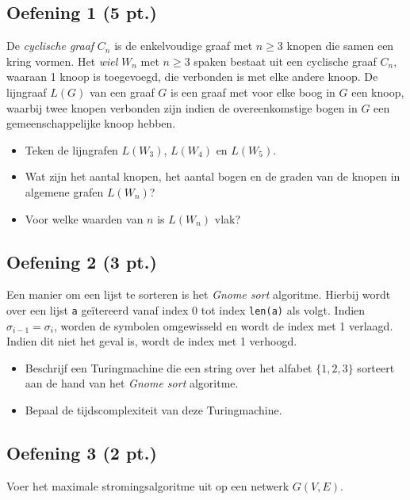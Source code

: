 \documentclass[kulak]{kulakarticle} %
\begin{document}
	\subsection*{Oefening 1 (5 pt.)}

	De \textit{cyclische graaf} \(C_n\) is de enkelvoudige graaf met \(n\geq3\) knopen die samen een kring vormen. Het \textit{wiel} \(W_n\) met \(n\geq3\) spaken bestaat uit een cyclische graaf \(C_n\), waaraan 1 knoop is toegevoegd, die verbonden is met elke andere knoop. De lijngraaf \(L(G)\) van een graaf \(G\) is een graaf met voor elke boog in \(G\) een knoop, waarbij twee knopen verbonden zijn indien de overeenkomstige bogen in \(G\) een gemeenschappelijke knoop hebben.

	\begin{itemize}
		\item Teken de lijngrafen \(L(W_3)\), \(L(W_4)\) en \(L(W_5)\).
		\item Wat zijn het aantal knopen, het aantal bogen en de graden van de knopen in algemene grafen \(L(W_n)\)?
		\item Voor welke waarden van \(n\) is \(L(W_n)\) vlak?
	\end{itemize}

	\subsection*{Oefening 2 (3 pt.)}

	Een manier om een lijst te sorteren is het \textit{Gnome sort} algoritme. Hierbij wordt over een lijst \texttt{a} geïtereerd vanaf index 0 tot index \texttt{len(a)} als volgt. Indien \(\sigma_{i-1}=\sigma_i\), worden de symbolen omgewisseld en wordt de index met 1 verlaagd. Indien dit niet het geval is, wordt de index met 1 verhoogd.

	\begin{itemize}
		\item Beschrijf een Turingmachine die een string over het alfabet \( \{ 1,2,3 \} \) sorteert aan de hand van het \textit{Gnome sort} algoritme.
		\item Bepaal de tijdscomplexiteit van deze Turingmachine.
	\end{itemize}

	\subsection*{Oefening 3 (2 pt.)}
	Voer het maximale stromingsalgoritme uit op een netwerk \(G(V,E)\).
\end{document}
